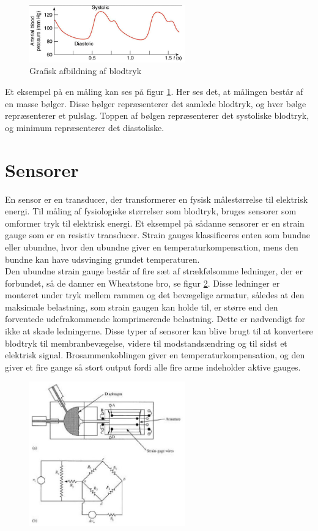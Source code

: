 \begin{figure}[H]
	\centering
	\includegraphics[width=0.6\textwidth]{Figurer/Fysio/trykmaaling}
	\caption{Grafisk afbildning af blodtryk \protect\cite{intramaalinggraf}}
	\label{grafiskmaaling}
\end{figure}

Et eksempel på en måling kan ses på figur \ref{grafiskmaaling}. Her ses det, at målingen består af en masse bølger. Disse bølger repræsenterer det samlede blodtryk, og hver bølge repræsenterer et pulslag. Toppen af bølgen repræsenterer det systoliske blodtryk, og minimum repræsenterer det diastoliske.  

\section{Sensorer}
En sensor er en transducer, der transformerer en fysisk målestørrelse til elektrisk energi. Til måling af fysiologiske størrelser som blodtryk, bruges sensorer som omformer tryk til elektrisk energi. Et eksempel på sådanne sensorer er en strain gauge som er en resistiv transducer. Strain gauges klassificeres enten som bundne eller ubundne, hvor den ubundne giver en temperaturkompensation, mens den bundne kan have udsvinging grundet temperaturen.\\
Den ubundne strain gauge består af fire sæt af strækfølsomme ledninger, der er forbundet, så de danner en Wheatstone bro, se figur \ref{StrainGauge}. Disse ledninger er monteret under tryk mellem rammen og det bevægelige armatur, således at den maksimale belastning, som strain gaugen kan holde til, er større end den forventede udefrakommende komprimerende belastning. Dette er nødvendigt for ikke at skade ledningerne. Disse typer af sensorer kan blive brugt til at konvertere blodtryk til membranbevægelse, videre til modstandsændring og til sidst et elektrisk signal. Brosammenkoblingen giver en temperaturkompensation, og den giver et fire gange så stort output fordi alle fire arme indeholder aktive gauges.\\

\begin{figure}[H]
	\centering
	\includegraphics[width=0.6\textwidth]{Figurer/Hardware/straingauge}
	\caption{}
	\label{StrainGauge}
\end{figure}








